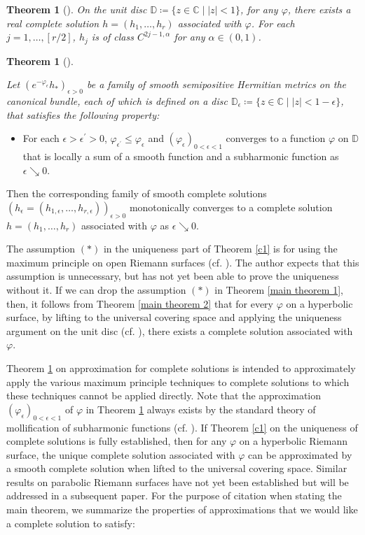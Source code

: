 \documentclass[12pt]{article}
\theoremstyle{definition}
\newtheorem{theo}[defi]{Theorem}
\def\refe{\ast}
\def\C{{\mathbb C}}
\def\D{{\mathbb D}}
\begin{document}
\begin{theo}[\cite{Miy5}]\label{c2} {\it On the unit disc $\D\coloneqq \{z\in\C\mid |z|<1\}$, for any $\varphi$, there exists a real complete solution $h=(h_1,\dots, h_r)$ associated with $\varphi$. For each $j=1,\dots, [r/2]$, $h_j$ is of class $C^{2j-1,\alpha}$ for any $\alpha\in(0,1)$. }
\end{theo}
\begin{theo}[\cite{Miy5}]\label{c3}{\it
Let $(e^{-\varphi_\epsilon}h_\refe)_{\epsilon>0}$ be a family of smooth semipositive Hermitian metrics on the canonical bundle, each of which is defined on a disc $\D_\epsilon \coloneqq \{z \in \C \mid |z| < 1 - \epsilon\}$, that satisfies the following property:
\begin{itemize}
\item For each $\epsilon>\epsilon^\prime>0$, $\varphi_{\epsilon^\prime}\leq \varphi_\epsilon$ and $(\varphi_\epsilon)_{0<\epsilon<1}$ converges to a function $\varphi$ on $\D$ that is locally a sum of a smooth function and a subharmonic function as $\epsilon\searrow 0$.
\end{itemize}
Then the corresponding family of smooth complete solutions $(h_\epsilon=(h_{1,\epsilon},\dots, h_{r,\epsilon}))_{\epsilon>0}$ monotonically converges to a complete solution $h=(h_1,\dots, h_r)$ associated with $\varphi$ as $\epsilon\searrow 0$.}
\end{theo}
The assumption $(\ast)$ in the uniqueness part of Theorem \ref{c1} is for using the maximum principle on open Riemann surfaces (cf. \cite[Section 3]{LM1}). The author expects that this assumption is unnecessary, but has not yet been able to prove the uniqueness without it. If we can drop the assumption $(\ast)$ in Theorem \ref{main theorem 1}, then, it follows from Theorem \ref{main theorem 2} that for every $\varphi$ on a hyperbolic surface, by lifting to the universal covering space and applying the uniqueness argument on the unit disc (cf. \cite[Proposition 5.7]{LM1}), there exists a complete solution associated with $\varphi$.

Theorem \ref{c3} on approximation for complete solutions is intended to approximately apply the various maximum principle techniques to complete solutions to which these techniques cannot be applied directly. Note that the approximation $(\varphi_\epsilon)_{0<\epsilon<1}$ of $\varphi$ in Theorem \ref{c3} always exists by the standard theory of mollification of subharmonic functions (cf. \cite{Ran1}). If Theorem \ref{c1} on the uniqueness of complete solutions is fully established, then for any $\varphi$ on a hyperbolic Riemann surface, the unique complete solution associated with $\varphi$ can be approximated by a smooth complete solution when lifted to the universal covering space. Similar results on parabolic Riemann surfaces have not yet been established but will be addressed in a subsequent paper. For the purpose of citation when stating the main theorem, we summarize the properties of approximations that we would like a complete solution to satisfy:
\end{document}
